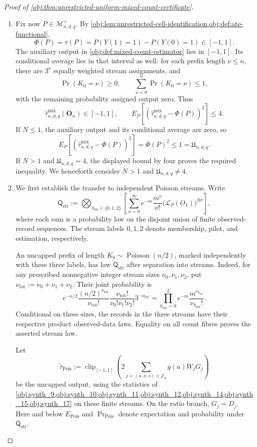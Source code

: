 \begin{proof}[Proof of \cref{obj:thm:unrestricted-uniform-mixed-count-certificate}]
\begin{enumerate}
\item Fix now \(P\in\mathcal M^+_{n,d,q}\). By
\cref{obj:lem:unrestricted-cell-identification,obj:def:ate-functional},
\[
\Phi(P)=\tau(P)
=P(Y(1)=1)-P(Y(0)=1)\in[-1,1].
\]
The auxiliary output in \cref{obj:def:mixed-count-estimator} lies in
\([-1,1]\). Its conditional average lies in that interval as well: for each
prefix length \(\nu\le n\), there are \(3^\nu\) equally weighted stream
assignments, and
\[
\Pr(K_0=\nu)\ge0,
\qquad
\sum_{\nu=0}^{n}\Pr(K_0=\nu)\le1,
\]
with the remaining probability assigned output zero. Thus
\[
\widehat\tau^{\mathrm{mix}}_{n,d,q}(\mathbf O_n)\in[-1,1],
\qquad
E_P\!\left[
(\widehat\tau^{\mathrm{mix}}_{n,d,q}-\Phi(P))^2
\right]\le4.
\]
If \(N\le1\), the auxiliary output and its conditional average are zero, so
\[
E_P\!\left[
(\widehat\tau^{\mathrm{mix}}_{n,d,q}-\Phi(P))^2
\right]=\Phi(P)^2\le1=\mathfrak U_{n,d,q}.
\]
If \(N>1\) and \(\mathfrak U_{n,d,q}=4\), the displayed bound by four proves
the required inequality. We henceforth consider
\(N>1\) and \(\mathfrak U_{n,d,q}\ne4\).

\item We first establish the transfer to independent Poisson streams.
Write
\[
\mathsf Q_{\mathrm{str}}
:=
\bigotimes_{h_{\mathrm{str}}\in\{0,1,2\}}
\left[
\sum_{\nu=0}^{\infty}
e^{-m}\frac{m^\nu}{\nu!}
\bigl(\mathcal L_P(O_1)\bigr)^{\otimes\nu}
\right],
\]
where each sum is a probability law on the disjoint union of finite
observed-record sequences. The stream labels \(0,1,2\) denote membership,
pilot, and estimation, respectively.

An uncapped prefix of length \(K_0\sim\operatorname{Poisson}(n/2)\), marked
independently with these three labels, has law \(\mathsf Q_{\mathrm{str}}\)
after separation into streams. Indeed, for any prescribed nonnegative
integer stream sizes \(\nu_0,\nu_1,\nu_2\), put
\(\nu_{\mathrm{tot}}:=\nu_0+\nu_1+\nu_2\). Their joint probability is
\[
e^{-n/2}\frac{(n/2)^{\nu_{\mathrm{tot}}}}{\nu_{\mathrm{tot}}!}
\frac{\nu_{\mathrm{tot}}!}{\nu_0!\nu_1!\nu_2!}
3^{-\nu_{\mathrm{tot}}}
=
\prod_{h_{\mathrm{str}}=0}^{2}
e^{-m}\frac{m^{\nu_{h_{\mathrm{str}}}}}
{\nu_{h_{\mathrm{str}}}!}.
\]
Conditional on these sizes, the records in the three streams have their
respective product observed-data laws. Equality on all count fibres proves
the asserted stream law.

Let
\[
\widetilde\tau_{\mathrm{Pois}}
:=
\operatorname{clip}_{[-1,1]}
\left(2\sum_{j=(a,x,s)\in\mathcal J_d}g(a)W_jG_j\right)
\]
be the uncapped output, using the statistics of
\cref{obj:synth_9,obj:synth_10,obj:synth_11,obj:synth_12,obj:synth_14,obj:synth_15,obj:synth_17}
on these finite streams. On the ratio branch, \(G_j=D_j\).
Here and below \(E_{\mathrm{Pois}}\) and
\(\Pr_{\mathrm{Pois}}\) denote expectation and probability under
\(\mathsf Q_{\mathrm{str}}\).


\end{enumerate}
\end{proof}
